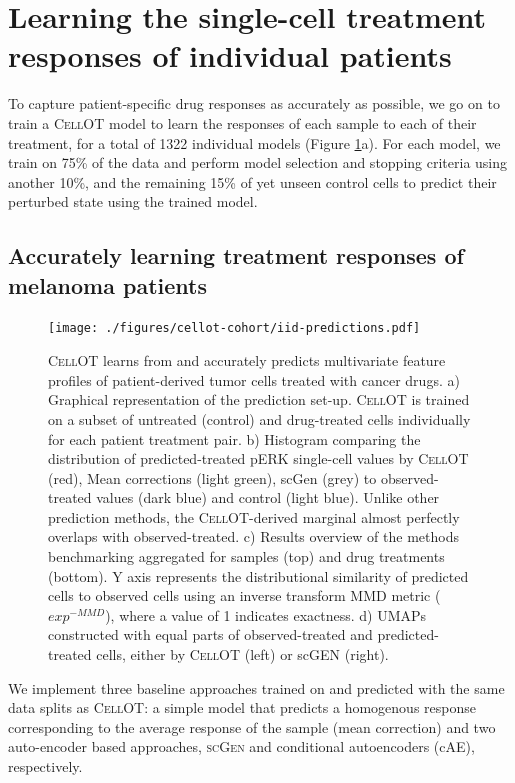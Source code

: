 \section{Learning the single-cell treatment responses of individual patients} \label{sec:cellot-cohort-iid}
To capture patient-specific drug responses as accurately as possible, we go on to train a \textsc{CellOT} model to learn the responses of each sample to each of their treatment, for a total of 1322 individual models (Figure \ref{fig:iid-prediction}a).
For each model, we train on 75\% of the data and perform model selection and stopping criteria using another 10\%,
and the remaining 15\% of yet unseen control cells to predict their perturbed state using the trained model.

\subsection{Accurately learning treatment responses of melanoma patients}

\begin{figure}[hp!]
  \begin{center}
    \texttt{[image: ./figures/cellot-cohort/iid-predictions.pdf]}
  \end{center}
  \caption{\textsc{CellOT} learns from and accurately predicts multivariate feature profiles of patient-derived tumor cells treated with cancer drugs.
  a) Graphical representation of the prediction set-up. \textsc{CellOT} is trained on a subset of untreated (control) and drug-treated cells individually for each patient treatment pair. 
  b) Histogram comparing the distribution of predicted-treated pERK single-cell values by \textsc{CellOT} (red), Mean corrections (light green), scGen (grey) to observed-treated values (dark blue) and control (light blue). Unlike other prediction methods, the \textsc{CellOT}-derived marginal almost perfectly overlaps with observed-treated.
  c) Results overview of the methods benchmarking aggregated for samples (top) and drug treatments (bottom). Y axis represents the distributional similarity of  predicted cells to observed cells using an inverse transform MMD metric ($exp^{-MMD}$), where a value of 1 indicates exactness. 
d) UMAPs constructed with equal parts of observed-treated and predicted-treated cells, either by \textsc{CellOT} (left) or scGEN (right).}
  \label{fig:iid-prediction}
\end{figure}

We implement three baseline approaches trained on and predicted with the same data splits as \textsc{CellOT}: a simple model that predicts a homogenous response corresponding to the average response of the sample (mean correction) and two auto-encoder based approaches, \textsc{scGen} \cite{lotfollahi2019} and conditional autoencoders \cite{lopez2018} (cAE), respectively. 

